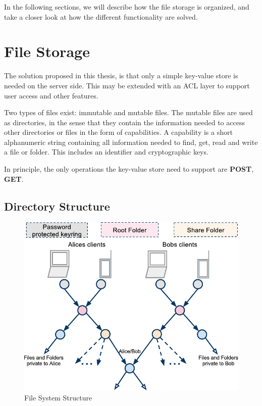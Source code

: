\documentclass[pdftex,english,10pt,b5paper,twoside]{book}
\begin{document}
In the following sections, we will describe how the file storage is organized,
and take a closer look at how the different functionality are solved.

\section{File Storage}
\label{sec:AS:FS}

The solution proposed in this thesis, is that only a simple key-value store is
needed on the server side. This may be extended with an \ac{ACL} layer to
support user access and other features.

Two types of files exist: immutable and mutable files. The mutable files are used
as directories, in the sense that they contain the information needed to access
other directories or files in the form of capabilities.
A capability is a short alphanumeric string containing all information needed
to find, get, read and write a file or folder. This includes an identifier and
cryptographic keys.

In principle, the only operations the key-value store need to support are
\textbf{POST}, \textbf{GET}.

\subsection{Directory Structure}

\begin{figure}[h!]
    \centering
    \includegraphics[width=\columnwidth]{ArchitectureFileSystem.pdf}
    \caption{File System Structure}
    \label{fig:AS:filesystem}
\end{figure}
\end{document}
